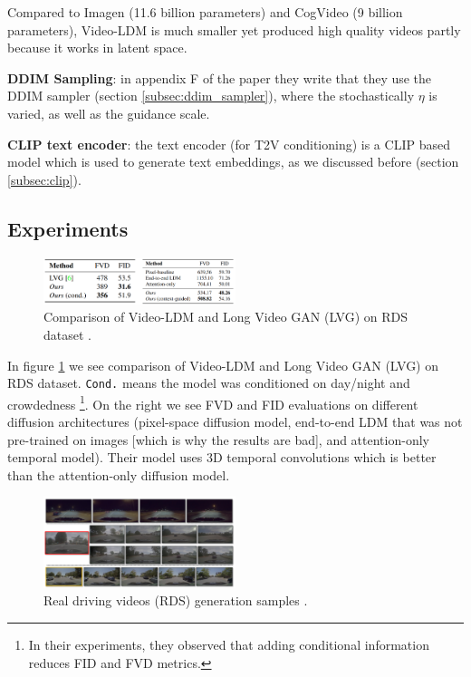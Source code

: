 Compared to Imagen (11.6 billion parameters) and CogVideo (9 billion parameters), Video-LDM is much smaller yet produced high quality videos partly because it works in latent space.

\textbf{DDIM Sampling}: in appendix F of the paper they write that they use the DDIM sampler \cite{ddim} (section \ref{subsec:ddim_sampler}), where the stochastically $\eta$ is varied, as well as the guidance scale.

\textbf{CLIP text encoder}: the text encoder (for T2V conditioning) is a CLIP \cite{openai_clip} based model which is used to generate text embeddings, as we discussed before (section \ref{subsec:clip}).










\subsection{Experiments}

\begin{figure}
    \centering
    \includegraphics[width=0.5\textwidth]{images/video_ldm/videoldm_vs_lvg_on_rds.png}
    \caption{Comparison of Video-LDM and Long Video GAN (LVG) on RDS dataset \cite{video_ldm}.}
    \label{fig:video_ldm_vs_lvg_on_rds}
\end{figure}

In figure \ref{fig:video_ldm_vs_lvg_on_rds} we see comparison of Video-LDM and Long Video GAN (LVG) on RDS dataset. \texttt{Cond.} means the model was conditioned on day/night and crowdedness \footnote{In their experiments, they observed that adding conditional information reduces FID and FVD metrics.}. On the right we see FVD and FID evaluations on different diffusion architectures (pixel-space diffusion model, end-to-end LDM that was not pre-trained on images [which is why the results are bad], and attention-only temporal model). Their model uses 3D temporal convolutions which is better than the attention-only diffusion model.

\begin{figure}
    \centering
    \includegraphics[width=0.5\textwidth]{images/video_ldm/rds.png}
    \caption{Real driving videos (RDS) generation samples \cite{video_ldm}.}
    \label{fig:video_ldm_rds}
\end{figure}

